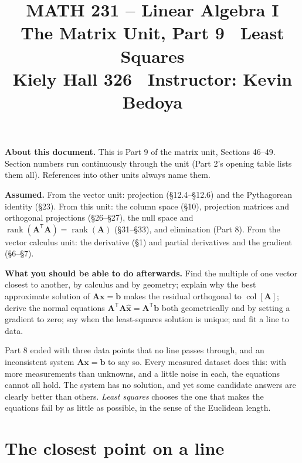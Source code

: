 \documentclass[11pt]{article}
\title{\vspace{-1.2cm}\textbf{\sffamily MATH 231 -- Linear Algebra I}\\[4pt]
       {\large\sffamily The Matrix Unit, Part 9 \textbullet\ Least Squares}\\[2pt]
       {\normalsize\sffamily Kiely Hall 326 \textbullet\
        Instructor: Kevin Bedoya}}
\author{}
\date{}
\theoremstyle{plain}
\theoremstyle{definition}
\theoremstyle{remark}
\newcommand{\vc}[1]{\mathbf{#1}}
\newcommand{\mt}[1]{\mathbf{#1}}
\newcommand{\T}{^{\mathsf{T}}}
\newcommand{\colsp}[1]{\operatorname{col}[#1]}
\newcommand{\xh}{\hat{\vc{x}}}
\DeclareMathOperator{\rank}{rank}
\begin{document}
\setcounter{section}{45}  %
\maketitle
\vspace{-1.6cm}

\noindent\textbf{About this document.} This is Part 9 of the matrix unit,
Sections 46--49. Section numbers run continuously through the unit (Part 2's
opening table lists them all). References into other units always name them.

\medskip
\noindent\textbf{Assumed.} From the vector unit: projection (\S12.4--\S12.6) and
the Pythagorean identity (\S23). From this unit: the column space (\S10),
projection matrices and orthogonal projections (\S26--\S27), the null space and
$\rank(\mt{A}\T\mt{A})=\rank(\mt{A})$ (\S31--\S33), and elimination (Part 8). From
the vector calculus unit: the derivative (\S1) and partial derivatives and the
gradient (\S6--\S7).

\medskip
\noindent\textbf{What you should be able to do afterwards.} Find the multiple of
one vector closest to another, by calculus and by geometry; explain why the best
approximate solution of $\mt{A}\vc{x}=\vc{b}$ makes the residual orthogonal to
$\colsp{\mt{A}}$; derive the normal equations
$\mt{A}\T\mt{A}\xh=\mt{A}\T\vc{b}$ both geometrically and by setting a gradient
to zero; say when the least-squares solution is unique; and fit a line to data.

\bigskip
\noindent Part 8 ended with three data points that no line passes through, and
an inconsistent system $\mt{A}\vc{x}=\vc{b}$ to say so. Every measured dataset
does this: with more measurements than unknowns, and a little noise in each, the
equations cannot all hold. The system has no solution, and yet some candidate
answers are clearly better than others. \emph{Least squares} chooses the one
that makes the equations fail by as little as possible, in the sense of the
Euclidean length.

\section{The closest point on a line}

\end{document}
